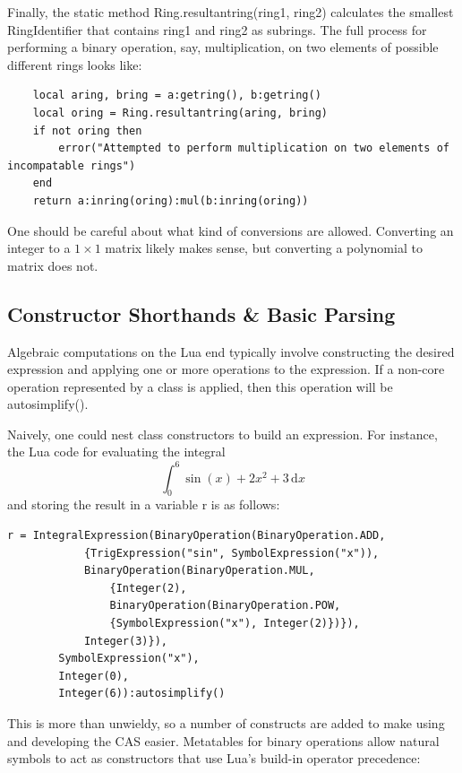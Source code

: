 \documentclass{article}
\begin{document}
Finally, the static method {\ttfamily Ring.resultantring(ring1, ring2)} calculates the smallest {\ttfamily RingIdentifier} that contains {\ttfamily ring1} and {\ttfamily ring2} as subrings. The full process for performing a binary operation, say, multiplication, on two elements of possible different rings looks like:

\begin{verbatim}
    local aring, bring = a:getring(), b:getring()
    local oring = Ring.resultantring(aring, bring)
    if not oring then
        error("Attempted to perform multiplication on two elements of incompatable rings")
    end
    return a:inring(oring):mul(b:inring(oring))
\end{verbatim}

One should be careful about what kind of conversions are allowed. Converting an integer to a $1\times1$ matrix likely makes sense, but converting a polynomial to matrix does not.

\subsection{Constructor Shorthands \& Basic Parsing}

Algebraic computations on the Lua end typically involve constructing the desired expression and applying one or more operations to the expression. If a non-core operation represented by a class is applied, then this operation will be {\ttfamily autosimplify()}.

Naively, one could nest class constructors to build an expression. For instance, the Lua code for evaluating the integral \[ \int_0^6 \sin(x) + 2x^2 + 3 \hspace{2pt}\mathrm{d}x\] and storing the result in a variable {\ttfamily r} is as follows:

\begin{verbatim}
r = IntegralExpression(BinaryOperation(BinaryOperation.ADD,
            {TrigExpression("sin", SymbolExpression("x")),
            BinaryOperation(BinaryOperation.MUL,
                {Integer(2),
                BinaryOperation(BinaryOperation.POW,
                {SymbolExpression("x"), Integer(2)})}),
            Integer(3)}),
        SymbolExpression("x"),
        Integer(0),
        Integer(6)):autosimplify()
\end{verbatim}

This is more than unwieldy, so a number of constructs are added to make using and developing the CAS easier. Metatables for binary operations allow natural symbols to act as constructors that use Lua's build-in operator precedence:
\end{document}
